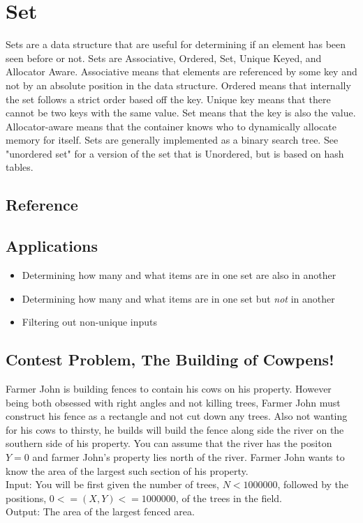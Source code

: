 \section{Set}
Sets are a data structure that are useful for determining if an element has been seen before or not.
Sets are Associative, Ordered, Set, Unique Keyed, and Allocator Aware\cite{cplusplus}.
Associative means that elements are referenced by some key and not by an absolute position in the data structure.
Ordered means that internally the set follows a strict order based off the key.
Unique key means that there cannot be two keys with the same value.
Set means that the key is also the value.
Allocator-aware means that the container knows who to dynamically allocate memory for itself.
Sets are generally implemented as a binary search tree.
See "unordered set" for a version of the set that is Unordered, but is based on hash tables.

\subsection{Reference}


\subsection{Applications}
\begin{itemize}
    \item   Determining how many and what items are in one set are also in another
    \item   Determining how many and what items are in one set but \emph{not} in another
    \item   Filtering out non-unique inputs
\end{itemize}

\subsection{Contest Problem, The Building of Cowpens!}
Farmer John is building fences to contain his cows on his property.
However being both obsessed with right angles and not killing trees, Farmer John must construct his fence as a rectangle and not cut down any trees.
Also not wanting for his cows to thirsty, he builds will build the fence along side the river on the southern side of his property.
You can assume that the river has the positon $Y=0$ and farmer John's property lies north of the river.
Farmer John wants to know the area of the largest such section of his property.\\
Input: You will be first given the number of trees, $N<1000000$, followed by the positions, $0<=(X,Y) <= 1000000$, of the trees in the field. \\
Output: The area of the largest fenced area.

